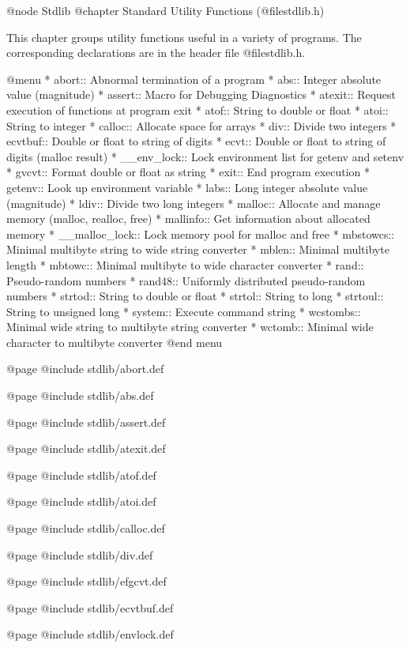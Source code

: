 @node Stdlib
@chapter Standard Utility Functions (@file{stdlib.h})

This chapter groups utility functions useful in a variety of programs.
The corresponding declarations are in the header file @file{stdlib.h}.

@menu 
* abort::       Abnormal termination of a program
* abs::         Integer absolute value (magnitude)
* assert::      Macro for Debugging Diagnostics
* atexit::      Request execution of functions at program exit
* atof::        String to double or float
* atoi::        String to integer
* calloc::      Allocate space for arrays
* div::         Divide two integers
* ecvtbuf::     Double or float to string of digits
* ecvt::        Double or float to string of digits (malloc result)
* __env_lock::		Lock environment list for getenv and setenv
* gvcvt::       Format double or float as string
* exit::        End program execution
* getenv::      Look up environment variable
* labs::        Long integer absolute value (magnitude)
* ldiv::        Divide two long integers
* malloc::      Allocate and manage memory (malloc, realloc, free)
* mallinfo::	Get information about allocated memory
* __malloc_lock::	Lock memory pool for malloc and free
* mbstowcs::	Minimal multibyte string to wide string converter
* mblen::	Minimal multibyte length
* mbtowc::      Minimal multibyte to wide character converter
* rand::        Pseudo-random numbers
* rand48::      Uniformly distributed pseudo-random numbers
* strtod::      String to double or float
* strtol::      String to long
* strtoul::     String to unsigned long
* system::      Execute command string
* wcstombs::	Minimal wide string to multibyte string converter
* wctomb::      Minimal wide character to multibyte converter
@end menu

@page
@include stdlib/abort.def

@page
@include stdlib/abs.def

@page
@include stdlib/assert.def

@page
@include stdlib/atexit.def

@page
@include stdlib/atof.def

@page
@include stdlib/atoi.def

@page
@include stdlib/calloc.def

@page
@include stdlib/div.def

@page
@include stdlib/efgcvt.def

@page
@include stdlib/ecvtbuf.def

@page
@include stdlib/envlock.def

